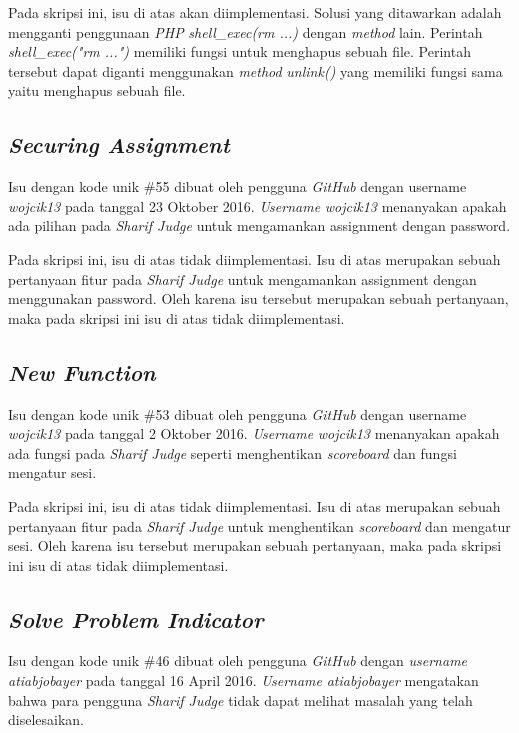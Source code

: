 Pada skripsi ini, isu di atas akan diimplementasi. Solusi yang ditawarkan adalah mengganti penggunaan \textit{PHP} \textit{shell\_exec(rm ...)} dengan \textit{method} lain.  Perintah \textit{shell\_exec("rm ...")} memiliki fungsi untuk menghapus sebuah file. Perintah tersebut dapat diganti menggunakan \textit{method} \textit{unlink()} yang memiliki fungsi sama yaitu menghapus sebuah file.

\subsection{\textit{Securing Assignment}}
Isu dengan kode unik \#55 dibuat oleh pengguna \textit{GitHub} dengan username \textit{wojcik13} pada tanggal 23 Oktober 2016. \textit{Username} \textit{wojcik13} menanyakan apakah ada pilihan pada \textit{Sharif Judge} untuk mengamankan assignment dengan password.

Pada skripsi ini, isu di atas tidak diimplementasi. Isu di atas merupakan sebuah pertanyaan fitur pada \textit{Sharif Judge} untuk mengamankan assignment dengan menggunakan password. Oleh karena isu tersebut merupakan sebuah pertanyaan, maka pada skripsi ini isu di atas tidak diimplementasi.

\subsection{\textit{New Function}}
Isu dengan kode unik \#53 dibuat oleh pengguna \textit{GitHub} dengan username \textit{wojcik13} pada tanggal 2 Oktober 2016. \textit{Username} \textit{wojcik13} menanyakan apakah ada fungsi pada \textit{Sharif Judge} seperti menghentikan \textit{scoreboard} dan fungsi mengatur sesi. 

Pada skripsi ini, isu di atas tidak diimplementasi. Isu di atas merupakan sebuah pertanyaan fitur pada \textit{Sharif Judge} untuk menghentikan \textit{scoreboard} dan mengatur sesi. Oleh karena isu tersebut merupakan sebuah pertanyaan, maka pada skripsi ini isu di atas tidak diimplementasi.

\subsection{\textit{Solve Problem Indicator}}
Isu dengan kode unik \#46 dibuat oleh pengguna \textit{GitHub} dengan \textit{username} \textit{atiabjobayer} pada tanggal 16 April 2016. \textit{Username} \textit{atiabjobayer} mengatakan bahwa para pengguna \textit{Sharif Judge} tidak dapat melihat masalah yang telah diselesaikan.

